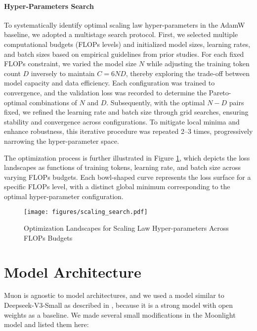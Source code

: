 \paragraph{Hyper-Parameters Search} To systematically identify optimal scaling law hyper-parameters in the AdamW baseline, we adopted a multistage search protocol. First, we selected multiple computational budgets (FLOPs levels) and initialized model sizes, learning rates, and batch sizes based on empirical guidelines from prior studies. For each fixed FLOPs constraint, we varied the model size $N$ while adjusting the training token count $D$ inversely to maintain 
$C=6ND$, thereby exploring the trade-off between model capacity and data efficiency. Each configuration was trained to convergence, and the validation loss was recorded to determine the Pareto-optimal combinations of $N$ and $D$. Subsequently, with the optimal $N-D$ pairs fixed, we refined the learning rate and batch size through grid searches, ensuring stability and convergence across configurations. To mitigate local minima and enhance robustness, this iterative procedure was repeated 2–3 times, progressively narrowing the hyper-parameter space. 

The optimization process is further illustrated in Figure \ref{fig:scaling_search}, which depicts the loss landscapes as functions of training tokens, learning rate, and batch size across varying FLOPs budgets. Each bowl-shaped curve represents the loss surface for a specific FLOPs level, with a distinct global minimum corresponding to the optimal hyper-parameter configuration. 

\begin{figure}[t]
    \centering
    \texttt{[image: figures/scaling\_search.pdf]}
    \caption{Optimization Landscapes for Scaling Law Hyper-parameters Across FLOPs Budgets} 
    \label{fig:scaling_search} 
\end{figure}



\section{Model Architecture}
\label{sec:appendix:modelarch}

Muon is agnostic to model architectures, and we used a model similar to Deepseek-V3-Small as described in \cite{deepseekai2024deepseekv3technicalreport}, because it is a strong model with open weights as a baseline. We made several small modifications in the Moonlight model and listed them here:


